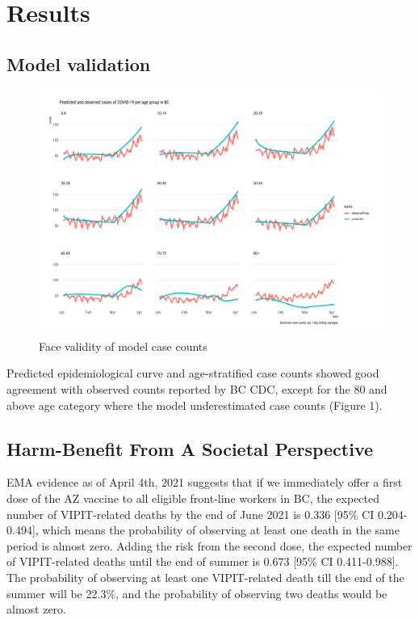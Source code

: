 \documentclass[]{interact}
\theoremstyle{plain}%
\theoremstyle{definition}
\theoremstyle{remark}
\begin{document}
\hypertarget{results}{%
\section{Results}\label{results}}

\hypertarget{model-validation}{%
\subsection{Model validation}\label{model-validation}}

\begin{figure}

{\centering \includegraphics[width=1\linewidth]{../figures/fig-validation} 

}

\caption{Face validity of model case counts}\label{fig:figValidation}
\end{figure}

Predicted epidemiological curve and age-stratified case counts showed
good agreement with observed counts reported by BC CDC, except for the
80 and above age category where the model underestimated case counts
(Figure 1).

\hypertarget{harm-benefit-from-a-societal-perspective}{%
\subsection{Harm-Benefit From A Societal
Perspective}\label{harm-benefit-from-a-societal-perspective}}

EMA evidence as of April 4th, 2021 suggests that if we immediately offer
a first dose of the AZ vaccine to all eligible front-line workers in BC,
the expected number of VIPIT-related deaths by the end of June 2021 is
0.336 {[}95\% CI 0.204-0.494{]}, which means the probability of
observing at least one death in the same period is almost zero. Adding
the risk from the second dose, the expected number of VIPIT-related
deaths until the end of summer is 0.673 {[}95\% CI 0.411-0.988{]}. The
probability of observing at least one VIPIT-related death till the end
of the summer will be 22.3\%, and the probability of observing two
deaths would be almost zero.
\end{document}
